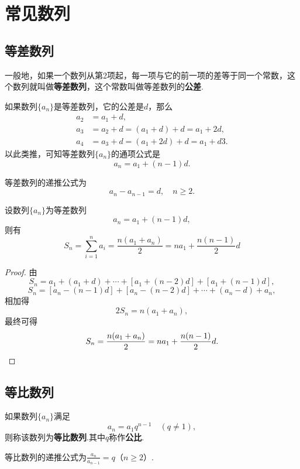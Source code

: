 \section{常见数列}
\subsection{等差数列}
\begin{definition}
一般地，如果一个数列从第2项起，每一项与它的前一项的差等于同一个常数，这个数列就叫做\textbf{等差数列}，这个常数叫做等差数列的\textbf{公差}.
\end{definition}

如果数列\(\{a_n\}\)是等差数列，它的公差是\(d\)，那么\begin{align*}
a_2 &= a_1 + d, \\
a_3 &= a_2 + d = (a_1 + d) + d = a_1 + 2d, \\
a_4 &= a_3 + d = (a_1 + 2d) + d = a_1 + d3.
\end{align*}以此类推，可知等差数列\(\{a_n\}\)的通项公式是\[
a_n = a_1 + (n-1) d.
\]

等差数列的递推公式为\[
a_n - a_{n-1} = d, \quad n \geqslant 2.
\]

\begin{property}[等差数列求和]
设数列\(\{a_n\}\)为等差数列\[
a_n = a_1 + (n-1) d,
\]则有\[
S_n = \sum\limits_{i=1}^{n} a_i
= \frac{n(a_1 + a_n)}{2}
= n a_1 + \frac{n(n-1)}{2} d
\]
\begin{proof}
由\[
S_n = a_1 + (a_1 + d) + \dotsb + [a_1 + (n-2)d] + [a_1 + (n-1)d],
\]\[
S_n = [a_n - (n-1)d] + [a_n - (n-2)d] + \dotsb + (a_n - d) + a_n,
\]相加得\[
2 S_n = n(a_1 + a_n),
\]最终可得\[
S_n = \frac{n(a_1 + a_n)}{2} = n a_1 + \frac{n(n-1)}{2} d.
\qedhere
\]
\end{proof}
\end{property}

\subsection{等比数列}
\begin{definition}
如果数列\(\{a_n\}\)满足\[
a_n = a_1 q^{n-1} \quad(q\neq1),
\]则称该数列为\textbf{等比数列}.其中\(q\)称作\textbf{公比}.

等比数列的递推公式为\(\frac{a_n}{a_{n-1}} = q\)（\(n \geqslant 2\)）.
\end{definition}

